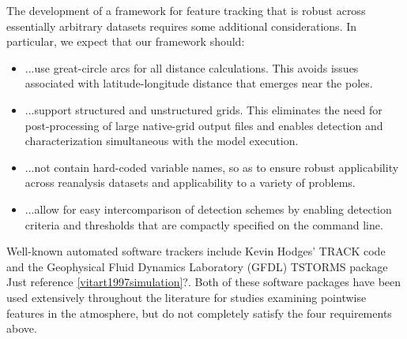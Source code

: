 \documentclass[gmdd, hvmath, online]{copernicus_discussions}
\begin{document}
The development of a framework for feature tracking that is robust across essentially arbitrary datasets requires some additional considerations.  In particular, we expect that our framework should:
\begin{itemize}
\item[] ...use great-circle arcs for all distance calculations.  This avoids issues associated with latitude-longitude distance that emerges near the poles.
\item[] ...support structured and unstructured grids.  This eliminates the need for post-processing of large native-grid output files and enables detection and characterization simultaneous with the model execution.
\item[] ...not contain hard-coded variable names, so as to ensure robust applicability across reanalysis datasets and applicability to a variety of problems.
\item[] ...allow for easy intercomparison of detection schemes by enabling detection criteria and thresholds that are compactly specified on the command line.
\end{itemize}  Well-known automated software trackers include Kevin Hodges' TRACK code \citep{hodges2015track} and the Geophysical Fluid Dynamics Laboratory (GFDL) TSTORMS package \citep{TSTORMS} {\color{red}Just reference \ref{vitart1997simulation}?}.  Both of these software packages have been used extensively throughout the literature for studies examining pointwise features in the atmosphere, but do not completely satisfy the four requirements above.
\end{document}
